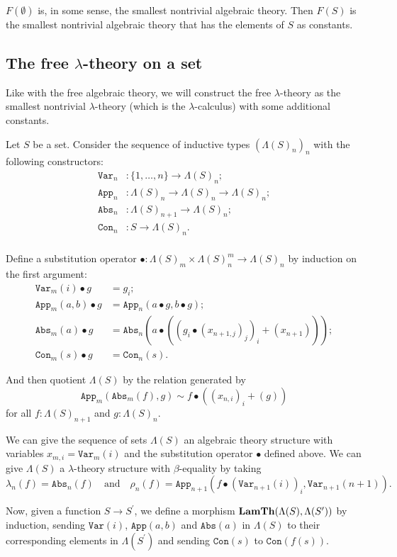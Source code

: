 $ F(\emptyset) $ is, in some sense, the smallest nontrivial algebraic theory. Then $ F(S) $ is the smallest nontrivial algebraic theory that has the elements of $ S $ as constants.

\subsection{The free \texorpdfstring{$ \lambda $}{lambda}-theory on a set}

Like with the free algebraic theory, we will construct the free $ \lambda $-theory as the smallest nontrivial $ \lambda $-theory (which is the $ \lambda $-calculus) with some additional constants.

Let $ S $ be a set. Consider the sequence of inductive types $ (\Lambda(S)_n)_n $ with the following constructors:
\begin{align*}
  \mathtt{Var}_n &: \{ 1, \dots, n \} \to \Lambda(S)_n;\\
  \mathtt{App}_n &: \Lambda(S)_n \to \Lambda(S)_n \to \Lambda(S)_n;\\
  \mathtt{Abs}_n &: \Lambda(S)_{n + 1} \to \Lambda(S)_n;\\
  \mathtt{Con}_n &: S \to \Lambda(S)_n.\\
\end{align*}

Define a substitution operator $ \bullet: \Lambda(S)_m \times \Lambda(S)_n^m \to \Lambda(S)_n $ by induction on the first argument:
\begin{align*}
  \mathtt{Var}_m(i) \bullet g &= g_i;\\
  \mathtt{App}_m(a, b) \bullet g &= \mathtt{App}_n(a \bullet g, b \bullet g);\\
  \mathtt{Abs}_m(a) \bullet g &= \mathtt{Abs}_n(a \bullet ((g_i \bullet (x_{n + 1, j})_j)_i + (x_{n + 1})));\\
  \mathtt{Con}_m(s) \bullet g &= \mathtt{Con}_n(s).
\end{align*}

And then quotient $ \Lambda(S) $ by the relation generated by
\[ \mathtt{App}_m(\mathtt{Abs}_m(f), g) \sim f \bullet ((x_{n, i})_i + (g)) \]
for all $ f: \Lambda(S)_{n + 1} $ and $ g: \Lambda(S)_n $.

\begin{example}
  We can give the sequence of sets $ \Lambda(S) $ an algebraic theory structure with variables $ x_{m, i} = \mathtt{Var}_m(i) $ and the substitution operator $ \bullet $ defined above. We can give $ \Lambda(S) $ a $ \lambda $-theory structure with $ \beta $-equality by taking
  \[ \lambda_n(f) = \mathtt{Abs}_n(f) \quad \text{and} \quad \rho_n(f) = \mathtt{App}_{n + 1}(f \bullet (\mathtt{Var}_{n + 1}(i))_i, \mathtt{Var}_{n + 1}(n + 1)). \]

  Now, given a function $ S \to S^\prime $, we define a morphism $ \mathbf{LamTh}(\Lambda(S), \Lambda(S^\prime)) $ by induction, sending $ \mathtt{Var}(i) $, $ \mathtt{App}(a, b) $ and $ \mathtt{Abs}(a) $ in $ \Lambda(S) $ to their corresponding elements in $ \Lambda(S^\prime) $ and sending $ \mathtt{Con}(s) $ to $ \mathtt{Con}(f(s)) $.
\end{example}

